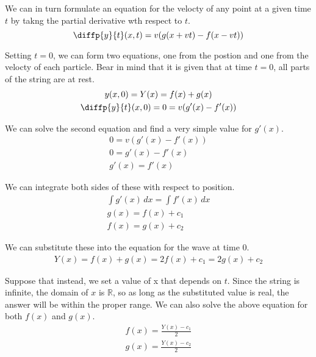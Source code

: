 \documentclass[12pt]{article}
\begin{document}
            We can in turn formulate an equation for the velocty of any point at a given time $t$ by takng the partial derivative wth respect to $t$.
            \begin{equation}
                \diffp{y}{t}(x,t) = v(g(x + vt) - f(x - vt))
            \end{equation}

            Setting $t = 0$, we can form two equations, one from the postion and one from the velocty of each particle.
            Bear in mind that it is given that at time $t = 0$, all parts of the string are at rest.
            \begin{gather}
                y(x,0) = Y(x) = f(x) + g(x)\\
                \diffp{y}{t}(x,0) = 0 = v(g'(x) - f'(x))
            \end{gather}

            We can solve the second equation and find a very simple value for $g'(x)$.
            \begin{gather}
                0 = v(g'(x) - f'(x))\\
                0 = g'(x) - f'(x)\\
                g'(x) = f'(x)
            \end{gather}

            We can integrate both sides of these with respect to position. 
            \begin{gather}
                \int g'(x)\,dx  =   \int f'(x)\,dx\\
                g(x)    =   f(x) + c_1\\
                f(x)    =   g(x) + c_2
            \end{gather}

            We can substitute these into the equation for the wave at time 0.
            \begin{gather}
                Y(x)    =   f(x) + g(x)
                    =   2f(x) + c_1
                    =   2g(x) + c_2
            \end{gather}

            Suppose that instead, we set a value of x that depends on $t$. 
            Since the string is infinite, the domain of $x$ is $\mathbb{R}$, so as long as the substituted value is real, the answer will be within the proper range.
            We can also solve the above equation for both $f(x)$ and $g(x)$.
            \begin{gather}
                f(x)    =   \frac{Y(x) - c_1}{2}\\
                g(x)    =   \frac{Y(x) - c_2}{2}
            \end{gather}
\end{document}

